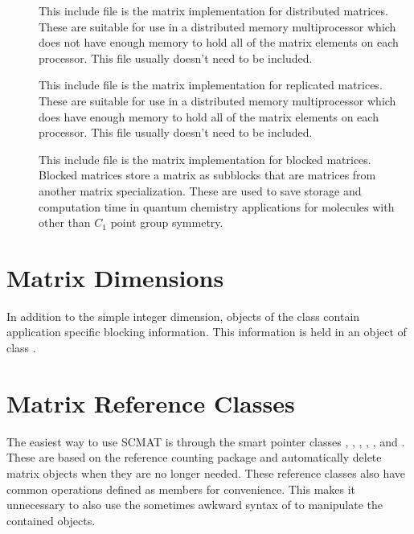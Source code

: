 \begin{description}
\item[]
This include file is the matrix implementation for distributed matrices.
These are suitable for use in a distributed memory multiprocessor which
does not have enough memory to hold all of the matrix elements on each
processor.  This file usually doesn't need to be included.

\item[]
This include file is the matrix implementation for replicated matrices.
These are suitable for use in a distributed memory multiprocessor which
does have enough memory to hold all of the matrix elements on each
processor.  This file usually doesn't need to be included.

\item[]
This include file is the matrix implementation for blocked matrices.
Blocked matrices store a matrix as subblocks that are matrices from another
matrix specialization.  These are used to save storage and computation time
in quantum chemistry applications for molecules with other than $C_1$ point
group symmetry.

\end{description}

\section{Matrix Dimensions}

In addition to the simple integer dimension, objects of the
 class contain application specific blocking
information.  This information is held in an object of class
.




\section{Matrix Reference Classes}\label{matrixrefclass}

The easiest way to use SCMAT is through the smart pointer classes
, ,
, ,
, and .  These are based
on the  reference counting package and automatically delete
matrix objects when they are no longer needed.  These reference classes
also have common operations defined as members for convenience.  This makes
it unnecessary to also use the sometimes awkward syntax of
 to manipulate the contained objects.

